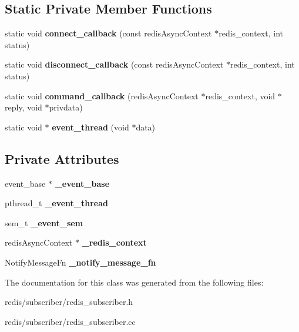 \subsection*{Static Private Member Functions}
\begin{DoxyCompactItemize}
\item 
\mbox{\label{classCRedisSubscriber_aa77a510f25ffb7376ba6b183a6b48067}} 
static void {\bfseries connect\+\_\+callback} (const redis\+Async\+Context $\ast$redis\+\_\+context, int status)
\item 
\mbox{\label{classCRedisSubscriber_a05bfb1d0a0970d1eaa24b9bc68ed926b}} 
static void {\bfseries disconnect\+\_\+callback} (const redis\+Async\+Context $\ast$redis\+\_\+context, int status)
\item 
\mbox{\label{classCRedisSubscriber_a1e7f2f8bc19c02959029d8f07de369f7}} 
static void {\bfseries command\+\_\+callback} (redis\+Async\+Context $\ast$redis\+\_\+context, void $\ast$reply, void $\ast$privdata)
\item 
\mbox{\label{classCRedisSubscriber_acaf0189862d3b1e670bbb7faed00a9b5}} 
static void $\ast$ {\bfseries event\+\_\+thread} (void $\ast$data)
\end{DoxyCompactItemize}
\subsection*{Private Attributes}
\begin{DoxyCompactItemize}
\item 
\mbox{\label{classCRedisSubscriber_ac8315d268596c9428b680a807ec2e201}} 
event\+\_\+base $\ast$ {\bfseries \+\_\+event\+\_\+base}
\item 
\mbox{\label{classCRedisSubscriber_a7000af1ba0864def342aa7b7fd3883be}} 
pthread\+\_\+t {\bfseries \+\_\+event\+\_\+thread}
\item 
\mbox{\label{classCRedisSubscriber_adcf026425dfecb08bad1ca652aad0306}} 
sem\+\_\+t {\bfseries \+\_\+event\+\_\+sem}
\item 
\mbox{\label{classCRedisSubscriber_a10d8a2562050b5906d0e67c83b013aa8}} 
redis\+Async\+Context $\ast$ {\bfseries \+\_\+redis\+\_\+context}
\item 
\mbox{\label{classCRedisSubscriber_abe11c1bbe2c935ac9b59284d2eed708d}} 
Notify\+Message\+Fn {\bfseries \+\_\+notify\+\_\+message\+\_\+fn}
\end{DoxyCompactItemize}


The documentation for this class was generated from the following files\+:\begin{DoxyCompactItemize}
\item 
redis/subscriber/redis\+\_\+subscriber.\+h\item 
redis/subscriber/redis\+\_\+subscriber.\+cc\end{DoxyCompactItemize}
